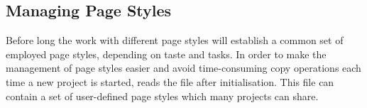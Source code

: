 \subsection{Managing Page Styles}\label{sec:scrpage.UI.cfgFile}
Before long the work with different page styles will establish a
common set of employed page styles, depending on taste and tasks.  In
order to make the management of page styles easier and avoid
time-consuming copy operations each time a new project is started,
 reads the file  after
initialisation.  This file can contain a set of user-defined page
styles which many projects can share.

\endinput


